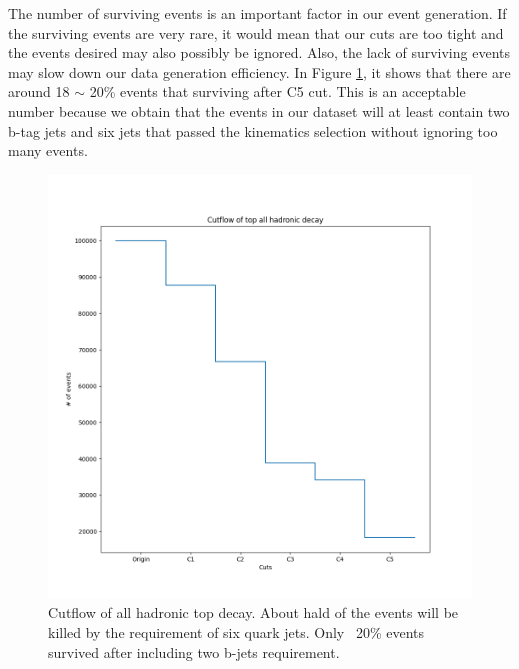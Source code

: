 The number of surviving events is an important factor in our event generation. If the surviving events are very rare, it would mean that our cuts are too tight and the events desired may also possibly be ignored. Also, the lack of surviving events may slow down our data generation efficiency. In Figure \ref{fig:cutflow}, it shows that there are around 18 $\sim$ 20\% events that surviving after C5 cut. This is an acceptable number because we obtain that the events in our dataset will at least contain two b-tag jets and six jets that passed the kinematics selection without ignoring too many events.
\\
\begin{figure}[H]
	\includegraphics[width=0.9\linewidth]{Figures/ttbar_cutflow.png}
	\caption{Cutflow of all hadronic top decay. About hald of the events will be killed by the requirement of six quark jets. Only ~20\% events survived after including two b-jets requirement.}
	\label{fig:cutflow}
\end{figure}
